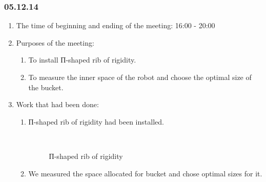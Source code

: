 \subsubsection{05.12.14}

\begin{enumerate}
	\item The time of beginning and ending of the meeting:
	16:00 - 20:00
	\item Purposes of the meeting:
	\begin{enumerate}
	  \item To install П-shaped rib of rigidity.
	  
	  \item To measure the inner space of the robot and choose the optimal size of the bucket.
	  
    \end{enumerate}
	\item Work that had been done:
	\begin{enumerate}
	  \item П-shaped rib of rigidity had been installed.
	  
	  \begin{figure}[H]
	  	\begin{minipage}[h]{0.2\linewidth}
	  		\center  
	  	\end{minipage}
	  	\begin{minipage}[h]{0.6\linewidth}
	  		\caption{П-shaped rib of rigidity}
	  	\end{minipage}
	  \end{figure}
	  
	  \item We measured the space allocated for bucket and chose optimal sizes for it.
	  

\end{enumerate}
\end{enumerate}
